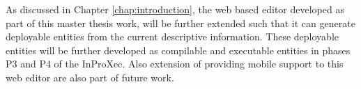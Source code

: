 As discussed in Chapter \ref{chap:introduction}, the web based editor developed as part of this master thesis work, will be further extended such that it can generate deployable entities from the current descriptive information. These deployable entities will be further developed as compilable and executable entities in phases P3 and P4 of the InProXec\cite{Sungur2015}. Also extension of providing mobile support to this web editor are also part of future work. 





